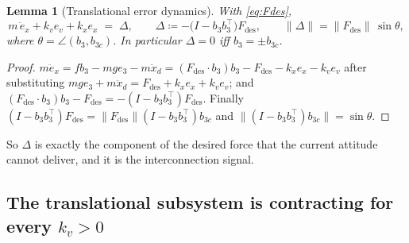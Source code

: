 \documentclass[11pt,a4paper]{article}
\newcommand{\norm}[1]{\lVert #1 \rVert}
\theoremstyle{plain}
\newtheorem{lemma}[theorem]{Lemma}
\theoremstyle{definition}
\theoremstyle{remark}
\begin{document}
\begin{lemma}[Translational error dynamics]
\label{lem:tr-err}
With \eqref{eq:Fdes},
\begin{equation}
  m\,\ddot e_x + k_v e_v + k_x e_x \;=\; \Delta,
  \qquad
  \Delta \coloneqq -\big(I - b_3b_3^{\top}\big)F_{\mathrm{des}},
  \qquad
  \norm{\Delta} = \norm{F_{\mathrm{des}}}\,\sin\theta ,
  \label{eq:tr-err}
\end{equation}
where $\theta = \angle(b_3,b_{3c})$. In particular $\Delta = 0$ iff $b_3 = \pm b_{3c}$.
\end{lemma}

\begin{proof}
$m\ddot e_x = fb_3 - mge_3 - m\ddot x_d = (F_{\mathrm{des}}\cdot b_3)b_3 - F_{\mathrm{des}} - k_xe_x - k_ve_v$
after substituting $mge_3+m\ddot x_d = F_{\mathrm{des}}+k_xe_x+k_ve_v$; and
$(F_{\mathrm{des}}\cdot b_3)b_3 - F_{\mathrm{des}} = -(I-b_3b_3^{\top})F_{\mathrm{des}}$.
Finally $(I-b_3b_3^{\top})F_{\mathrm{des}} = \norm{F_{\mathrm{des}}}(I-b_3b_3^{\top})b_{3c}$
and $\norm{(I-b_3b_3^{\top})b_{3c}} = \sin\theta$.
\end{proof}

So $\Delta$ is exactly the component of the desired force that the current attitude
cannot deliver, and it is the interconnection signal.

\subsection{The translational subsystem is contracting for every $k_v>0$}
\end{document}

